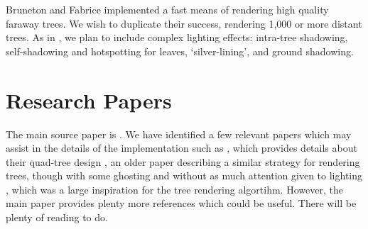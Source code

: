 \documentclass{article}
\begin{document}
Bruneton and Fabrice\cite{trees} implemented a fast means of rendering high quality faraway trees.  We wish to duplicate their success, rendering 1,000 or more distant trees.  As in \cite{trees}, we plan to include complex lighting effects: intra-tree shadowing, self-shadowing and hotspotting for leaves, ‘silver-lining’, and ground shadowing.

\section{Research Papers}
The main source paper is \cite{trees}. We have identified a few relevant papers which may assist in the details of the implementation such as 
\cite{vecterrain}, which provides details about their quad-tree design \cite{treeszbuf}, an older paper describing a similar strategy for rendering trees, though with some ghosting and without as much attention given to lighting \cite{fastlightfield}, which was a large inspiration for the tree rendering algortihm.  However, the main paper provides plenty more references which could be useful. There will be plenty of reading to do.

\end{document}

